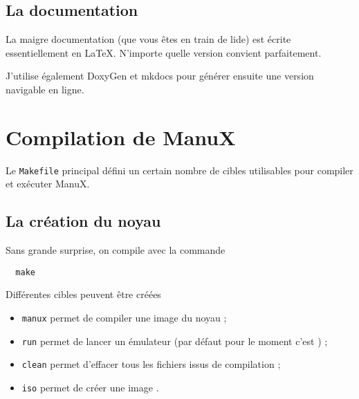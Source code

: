 \subsection{La documentation}

   La maigre documentation (que vous êtes  en train de lide) est
écrite essentiellement en LaTeX. N'importe quelle version convient
parfaitement.

   J'utilise également DoxyGen et mkdocs pour générer ensuite une
version navigable en ligne.

%
\section{Compilation de ManuX}

   Le {\tt Makefile} principal défini un certain nombre de cibles
utilisables pour compiler et exécuter ManuX.
   
%
\subsection{La création du noyau}

   Sans grande surprise, on compile avec la commande

\begin{lstlisting}
  make
\end{lstlisting}

  Différentes cibles peuvent être créées

\begin{itemize}
   \item {\tt manux} permet de compiler une image du noyau ;
   \item {\tt run} permet de lancer un émulateur (par défaut pour le moment c'est \qemu) ;
   \item {\tt clean} permet d'effacer tous les fichiers issus de compilation ;
   \item {\tt iso} permet de créer une image \iso.
\end{itemize}

%
